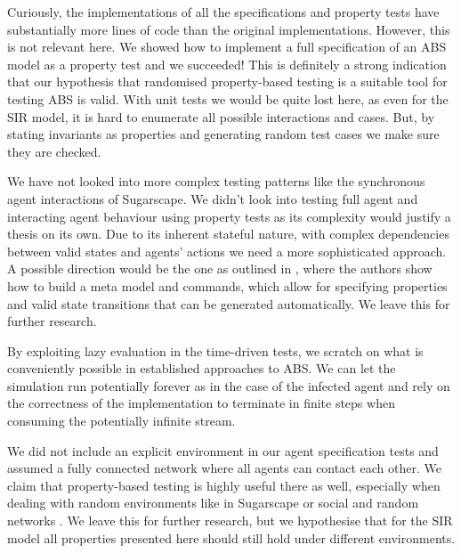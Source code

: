Curiously, the implementations of all the specifications and property tests have substantially more lines of code than the original implementations. However, this is not relevant here. We showed how to implement a full specification of an ABS model as a property test and we succeeded! This is definitely a strong indication that our hypothesis that randomised property-based testing is a suitable tool for testing ABS is valid. With unit tests we would be quite lost here, as even for the SIR model, it is hard to enumerate all possible interactions and cases. But, by stating invariants as properties and generating random test cases we make sure they are checked.

We have not looked into more complex testing patterns like the synchronous agent interactions of Sugarscape. We didn't look into testing full agent and interacting agent behaviour using property tests as its complexity would justify a thesis on its own. Due to its inherent stateful nature, with complex dependencies between valid states and agents' actions we need a more sophisticated approach. A possible direction would be the one as outlined in \cite{de_vries_quickcheckstatemachine}, where the authors show how to build a meta model and commands, which allow for specifying properties and valid state transitions that can be generated automatically. We leave this for further research.

By exploiting lazy evaluation in the time-driven tests, we scratch on what is conveniently possible in established approaches to ABS. We can let the simulation run potentially forever as in the case of the infected agent and rely on the correctness of the implementation to terminate in finite steps when consuming the potentially infinite stream.

We did not include an explicit environment in our agent specification tests and assumed a fully connected network where all agents can contact each other. We claim that property-based testing is highly useful there as well, especially when dealing with random environments like in Sugarscape or social and random networks \cite{easley_networks_2010,jackson_social_2008}. We leave this for further research, but we hypothesise that for the SIR model all properties presented here should still hold under different environments.
